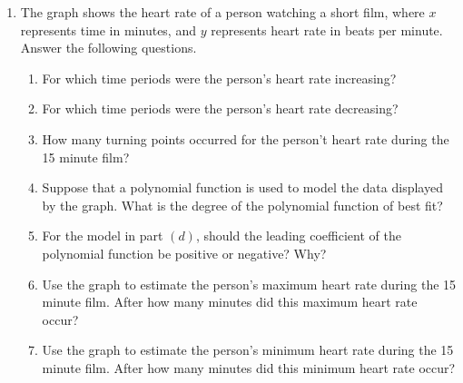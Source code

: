 \documentclass[11pt]{article}
\begin{document}
\begin{enumerate}
\begin{center}

\end{center}
\item The graph shows the heart rate of a person watching a short film, where $x$ represents time in minutes, and $y$ represents heart rate in beats per minute.  Answer the following questions.
\begin{enumerate}
\item For which time periods were the person's heart rate increasing?
\vfill
\item For which time periods were the person's heart rate decreasing?
\vfill
\item How many turning points occurred for the person't heart rate during the 15 minute film?
\vfill
\item Suppose that a polynomial function is used to model the data displayed by the graph.  What is the degree of the polynomial function of best fit?
\vfill
\item For the model in part $(d)$, should the leading coefficient of the polynomial function be positive or negative?  Why?
\vfill
\item Use the graph to estimate the person's maximum heart rate during the 15 minute film.  After how many minutes did this maximum heart rate occur?
\vfill
\item Use the graph to estimate the person's minimum heart rate during the 15 minute film.  After how many minutes did this minimum heart rate occur?
\vfill


\end{enumerate}
\end{enumerate}
\end{document}
